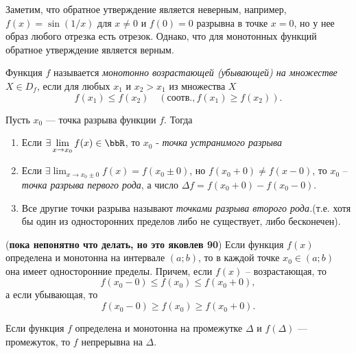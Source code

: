 Заметим, что обратное утверждение является неверным, например, $f(x)= \sin(1/x)$ для $x\ne0$ и $f(0) = 0$ разрывна в точке $x = 0$, но у нее образ любого отрезка есть отрезок. Однако, что для монотонных функций обратное утверждение является верным.
\begin{defn}
Функция $f$ называется \textit{монотонно возрастающей (убывающей) на множестве} $X \in D_f$, если для любых $x_1$ и $x_2>x_1$ из множества $X$ 
$$
f(x_1)\le f(x_2) \quad (\text{соотв.}, f(x_1)\ge f(x_2)).
$$  
\end{defn}

\begin{defn}
Пусть $x_0$ --- точка разрыва функции $f$. Тогда 
\begin{enumerate}
\item

Если $\exists \lim_{x \to x_0}\limits f(x) \in \bbR$, то $x_0$ - \textit{точка устранимого разрыва}
\item
Если $\exists \lim_{x \to x_0\pm0}\limits f(x)=f(x_0\pm 0)$, но $f(x_0+0)\ne f(x-0)$, то $x_0$ -- \textit{точка разрыва первого рода}, а число $\Delta f=f(x_0+0)-f(x_0-0)$.
\item
Все другие точки разрыва называют \textit{точками разрыва второго рода.}(т.е. хотя бы один из односторонних пределов либо не существует, либо бесконечен).
\end{enumerate}
\end{defn}
\begin{thm} \label{ch3n1} (\textbf{пока непонятно что делать, но это яковлев 90})
Если функция $f(x)$ определена и монотонна на интервале $(a;b)$, то в каждой точке $x_0\in(a;b)$ она имеет односторонние пределы. Причем, если $f(x)$ -- возрастающая, то 
$$
f(x_0-0)\le f(x_0)\le f(x_0+0),
$$
а если убывающая, то
$$
f(x_0-0)\ge f(x_0)\ge f(x_0+0).
$$
\end{thm}
\begin{thm}
Если функция $f$ определена и монотонна на промежутке $\Delta$ и $f(\Delta)$ — промежуток, то $f$ непрерывна на $\Delta$.
\end{thm}
